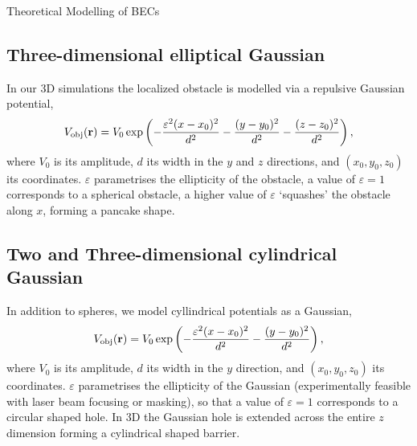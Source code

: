 \begin{chapter}{\label{cha:theoretical_model}Theoretical Modelling of BECs}
\subsection{\label{section:3dobjpotential} Three-dimensional elliptical Gaussian}
In our 3D simulations the localized obstacle is modelled via a repulsive Gaussian potential,
\begin{equation}
V_{\mathrm{obj}}({\bf r})=V_0 \exp \left( -\frac{\varepsilon^2(x-x_0)^2}{d^2} -\frac{(y-y_0)^2}{d^2}-\frac{(z-z_0)^2}{d^2}\right),
\label{eq:potential3D}
\end{equation}
where  $V_0$ is its amplitude, $d$ its width in the $y$ and $z$ directions, and $(x_0,y_0,z_0)$ its coordinates. $\varepsilon$ parametrises the ellipticity of the obstacle, a value of $\varepsilon=1$ corresponds to a spherical obstacle, a higher value of $\varepsilon$ `squashes' the obstacle along $x$, forming a pancake shape.

\subsection{\label{section:3dcylinderpotential} Two and Three-dimensional cylindrical Gaussian}
In addition to spheres, we model cyllindrical potentials as a Gaussian,
\begin{equation}
V_{\mathrm{obj}}({\bf r})=V_0 \exp \left( -\frac{\varepsilon^2(x-x_0)^2}{d^2} -\frac{(y-y_0)^2}{d^2}\right),
\end{equation}
where  $V_0$ is its amplitude, $d$ its width in the $y$ direction, and $(x_0,y_0,z_0)$ its coordinates. $\varepsilon$ parametrises the ellipticity of the Gaussian (experimentally feasible with laser beam focusing or masking), so that a value of $\varepsilon=1$ corresponds to a circular shaped hole. In 3D the Gaussian hole is extended across the entire $z$ dimension forming a cylindrical shaped barrier.

\end{chapter}
